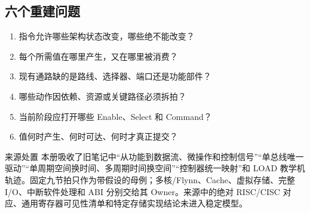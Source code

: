 \documentclass[UTF8,fontset=fandol,11pt,a4paper]{ctexart}
\begin{document}
\subsection*{六个重建问题}
\begin{enumerate}
  \item 指令允许哪些架构状态改变，哪些绝不能改变？
  \item 每个所需值在哪里产生，又在哪里被消费？
  \item 现有通路缺的是路线、选择器、端口还是功能部件？
  \item 哪些动作因依赖、资源或关键路径必须拆拍？
  \item 当前阶段应打开哪些 Enable、Select 和 Command？
  \item 值何时产生、何时可达、何时才真正提交？
\end{enumerate}

\begin{methodbox}{来源处置}
本册吸收了旧笔记中“从功能到数据流、微操作和控制信号”“单总线唯一驱动”“单周期空间换时间、多周期时间换空间”“控制器统一映射”和 LOAD 教学机轨迹。固定九节拍只作为带假设的母例；多核/Flynn、Cache、虚拟存储、完整 I/O、中断软件处理和 ABI 分别交给其 Owner。来源中的绝对 RISC/CISC 对应、通用寄存器可见性清单和特定存储实现结论未进入稳定模型。
\end{methodbox}
\end{document}
